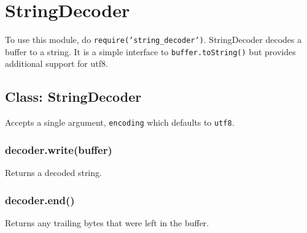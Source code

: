 \section{StringDecoder}\label{stringdecoder}

\begin{Shaded}
\begin{Highlighting}[]
 
\end{Highlighting}
\end{Shaded}

To use this module, do \texttt{require('string\_decoder')}.
StringDecoder decodes a buffer to a string. It is a simple interface to
\texttt{buffer.toString()} but provides additional support for utf8.

\begin{Shaded}
\begin{Highlighting}[]
 \NormalTok{(}\NormalTok{;}
  \NormalTok{(}\NormalTok{);}

  \NormalTok{([}\NormalTok{, }\NormalTok{]);}
\NormalTok{(}

  \NormalTok{([}\NormalTok{, }\NormalTok{, }\NormalTok{]);}
\NormalTok{(}
\end{Highlighting}
\end{Shaded}

\subsection{Class: StringDecoder}\label{class-stringdecoder}

Accepts a single argument, \texttt{encoding} which defaults to
\texttt{utf8}.

\subsubsection{decoder.write(buffer)}\label{decoder.writebuffer}

Returns a decoded string.

\subsubsection{decoder.end()}\label{decoder.end}

Returns any trailing bytes that were left in the buffer.
